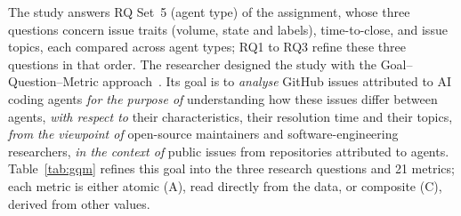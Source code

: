 The study answers RQ Set~5 (agent type) of the assignment, whose three questions concern issue traits (volume, state and labels), time-to-close, and issue topics, each compared across agent types; RQ1 to RQ3 refine these three questions in that order. The researcher designed the study with the Goal--Question--Metric approach~\cite{basili1994gqm}. Its goal is to \emph{analyse} GitHub issues attributed to AI coding agents \emph{for the purpose of} understanding how these issues differ between agents, \emph{with respect to} their characteristics, their resolution time and their topics, \emph{from the viewpoint of} open-source maintainers and software-engineering researchers, \emph{in the context of} \NIssues{} public issues from \NRepos{} repositories attributed to \NAgents{} agents. Table~\ref{tab:gqm} refines this goal into the three research questions and 21 metrics; each metric is either atomic (A), read directly from the data, or composite (C), derived from other values.

